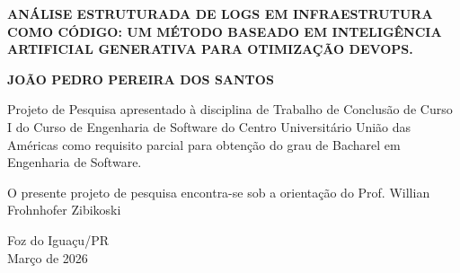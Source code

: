 \begin{titlepage}
    \begin{center}
        \large\textbf{ANÁLISE ESTRUTURADA DE LOGS EM INFRAESTRUTURA COMO CÓDIGO: UM MÉTODO BASEADO EM INTELIGÊNCIA ARTIFICIAL GENERATIVA PARA OTIMIZAÇÃO DEVOPS.}
        
        \vspace{3cm} 
        
        \textbf{JOÃO PEDRO PEREIRA DOS SANTOS}
    \end{center}
    
    \vfill 
        \begin{flushright}
        \begin{minipage}{0.5\textwidth}
            \small 
            Projeto de Pesquisa apresentado à disciplina de Trabalho de Conclusão de Curso I do Curso de Engenharia de Software do Centro Universitário União das Américas como requisito parcial para obtenção do grau de Bacharel em Engenharia de Software.
            
            \vspace{0.5cm}
            
            O presente projeto de pesquisa encontra-se sob a orientação do Prof. Willian Frohnhofer Zibikoski
        \end{minipage}
    \end{flushright}
    
    \vfill 
    \begin{center}
        Foz do Iguaçu/PR \\ Março de 2026
    \end{center}
\end{titlepage}
